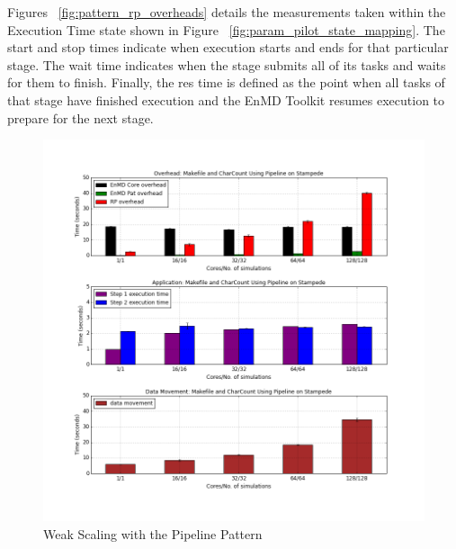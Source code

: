 \documentclass[]{article}
\begin{document}

		Figures ~\ref{fig:pattern_rp_overheads} details the measurements taken within the Execution Time state shown in Figure ~\ref{fig:param_pilot_state_mapping}. The start and stop times indicate when execution starts and ends for that particular stage. The wait time indicates when the stage submits all of its tasks and waits for them to finish. Finally, the res time is defined as the point when all tasks of that stage have finished execution and the EnMD Toolkit resumes execution to prepare for the next stage.

		\begin{figure}[H]
			\centering
			\includegraphics[scale=.30]{iteration_3/pipeline_weak_scaling.png}
			\caption{Weak Scaling with the Pipeline Pattern}
			\label{fig:pipeline_weak_scaling}
		\end{figure}
\end{document}
